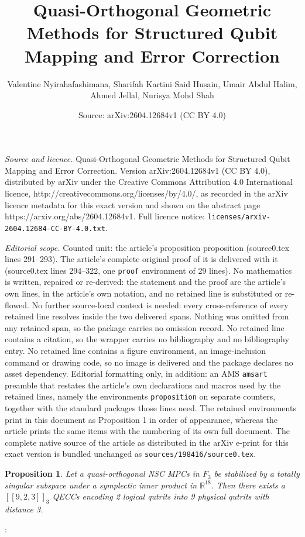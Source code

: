 \documentclass[10pt,a4paper]{amsart}
\title{Quasi-Orthogonal Geometric Methods for Structured Qubit Mapping and Error Correction}
\author{Valentine Nyirahafashimana, Sharifah Kartini Said Husain, Umair Abdul Halim, Ahmed Jellal, Nurisya Mohd Shah}
\date{Source: arXiv:2604.12684v1 (CC BY 4.0)}
\newtheorem{proposition}{Proposition}
\begin{document}
\maketitle

\noindent\emph{Source and licence.} Quasi-Orthogonal Geometric Methods for Structured Qubit Mapping and Error Correction. Version arXiv:2604.12684v1 (CC BY 4.0), distributed by arXiv under the Creative Commons Attribution 4.0 International licence, http://creativecommons.org/licenses/by/4.0/, as recorded in the arXiv licence metadata for this exact version and shown on the abstract page https://arxiv.org/abs/2604.12684v1. Full licence notice: \texttt{licenses/arxiv-2604.12684-CC-BY-4.0.txt}.\par\smallskip

\noindent\textit{Editorial scope.} Counted unit: the article's proposition proposition (source0.tex lines 291--293). The article's complete original proof of it is delivered with it (source0.tex lines 294--322, one \texttt{proof} environment of 29 lines). No mathematics is written, repaired or re-derived: the statement and the proof are the article's own lines, in the article's own notation, and no retained line is substituted or re-flowed.  No further source-local context is needed: every cross-reference of every retained line resolves inside the two delivered spans.  Nothing was omitted from any retained span, so the package carries no omission record.  No retained line contains a citation, so the wrapper carries no bibliography and no bibliography entry.  No retained line contains a figure environment, an image-inclusion command or drawing code, so no image is delivered and the package declares no asset dependency.  Editorial formatting only, in addition: an AMS \texttt{amsart} preamble that restates the article's own declarations and macros used by the retained lines, namely the environments \texttt{proposition} on separate counters, together with the standard packages those lines need.  The retained environments print in this document as Proposition 1 in order of appearance, whereas the article prints the same items with the numbering of its own full document.  The complete native source of the article as distributed in the arXiv e-print for this exact version is bundled unchanged as \texttt{sources/198416/source0.tex}.
\begin{proposition}
Let a quasi-orthogonal NSC MPCs in $F_3$ be stabilized by a totally singular subspace under a symplectic inner product in  \( \mathbb{R}^{18}\). Then there exists a \([[9,2,3]]_3\)  QECCs encoding 2 logical qutrits into 9 physical qutrits with distance 3.
\end{proposition}:
\end{document}
